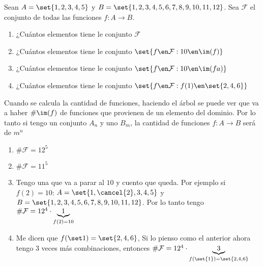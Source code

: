 \begin{enunciado}{\ejercicio}
  Sean $A = \set{1,2,3,4,5}$ y $B = \set{1,2,3,4,5,6,7,8,9,10,11,12}$. Sea $\mathcal F$ el conjunto de todas las funciones
  $f: A \to B$.
  \begin{enumerate}[label=\roman*)]
    \item  ¿Cuántos elementos tiene le conjunto $\mathcal F$
    \item  ¿Cuántos elementos tiene le conjunto $\set{f \en \mathcal F : 10 \en \im(f) }$
    \item  ¿Cuántos elementos tiene le conjunto $\set{f \en \mathcal F : 10 \en \im(fa)}$
    \item  ¿Cuántos elementos tiene le conjunto $\set{f \en \mathcal F : f(1) \en \set{2,4,6} }$
  \end{enumerate}
\end{enunciado}

Cuando se calcula la cantidad de funciones, haciendo el árbol se puede ver que va a haber
$\#\im(f)$ de funciones que provienen de un elemento del dominio.
Por lo tanto si tengo un conjunto $A_n$ y uno $B_m$, la cantidad de funciones $f : A \to B$ será
de $m^n$

\begin{enumerate}[label=\roman*)]
  \item $\# \mathcal F = 12^5$

  \item $\# \mathcal F = 11^5$

  \item Tengo una que va a parar al $10$ y cuento que queda. Por ejemplo si $f(2) = 10$: $A = \set{1,\cancel{2},3,4,5}$ y $B = \set{1,2,3,4,5,6,7,8,9,10,11,12}$.
        Por lo tanto tengo $\# \mathcal F = 12^4 \cdot \underbrace{\normalsize 1}_{f (2) = 10}$\\

  \item Me dicen que $f(\set1) = \set{2,4,6}$,
        Si lo pienso como el anterior ahora tengo 3 veces más combinaciones, entonces
        $\# \mathcal F = 12^4 \cdot \underbrace{\tiny 3}_{ f (\set{1})= \set{2,4,6}}$
\end{enumerate}
